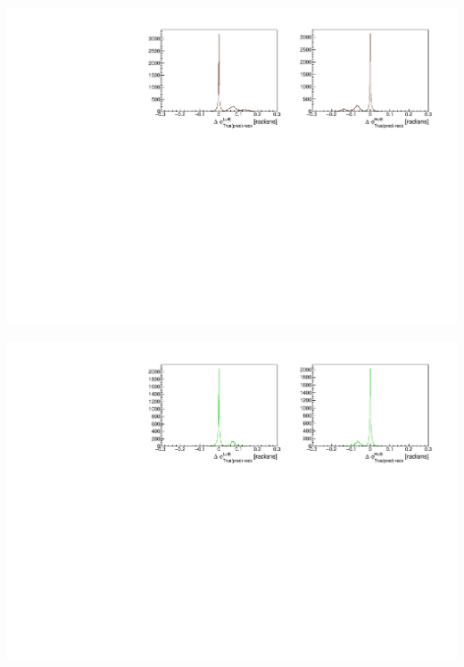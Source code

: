 \documentclass[8pt]{beamer}
\begin{document}
\begin{frame}
	\includegraphics[width=\textwidth]{VBilder/b2b_Data}
	
	\includegraphics[width=\textwidth]{VBilder/b2b_MC}
\end{frame}
\end{document}
